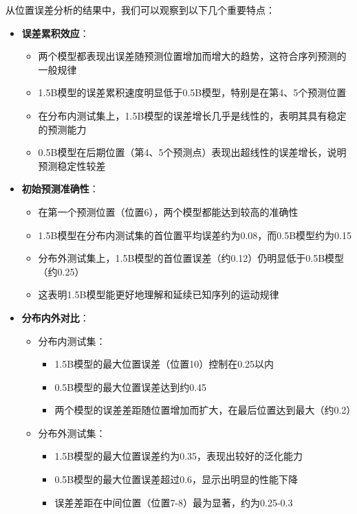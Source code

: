 \documentclass[a4paper, 12pt]{article}
\begin{document}
从位置误差分析的结果中，我们可以观察到以下几个重要特点：

\begin{itemize}
    \item \textbf{误差累积效应}：
        \begin{itemize}
            \item 两个模型都表现出误差随预测位置增加而增大的趋势，这符合序列预测的一般规律
            \item 1.5B模型的误差累积速度明显低于0.5B模型，特别是在第4、5个预测位置
            \item 在分布内测试集上，1.5B模型的误差增长几乎是线性的，表明其具有稳定的预测能力
            \item 0.5B模型在后期位置（第4、5个预测点）表现出超线性的误差增长，说明预测稳定性较差
        \end{itemize}
    
    \item \textbf{初始预测准确性}：
        \begin{itemize}
            \item 在第一个预测位置（位置6），两个模型都能达到较高的准确性
            \item 1.5B模型在分布内测试集的首位置平均误差约为0.08，而0.5B模型约为0.15
            \item 分布外测试集上，1.5B模型的首位置误差（约0.12）仍明显低于0.5B模型（约0.25）
            \item 这表明1.5B模型能更好地理解和延续已知序列的运动规律
        \end{itemize}
    
    \item \textbf{分布内外对比}：
        \begin{itemize}
            \item 分布内测试集：
                \begin{itemize}
                    \item 1.5B模型的最大位置误差（位置10）控制在0.25以内
                    \item 0.5B模型的最大位置误差达到约0.45
                    \item 两个模型的误差差距随位置增加而扩大，在最后位置达到最大（约0.2）
                \end{itemize}
            \item 分布外测试集：
                \begin{itemize}
                    \item 1.5B模型的最大位置误差约为0.35，表现出较好的泛化能力
                    \item 0.5B模型的最大位置误差超过0.6，显示出明显的性能下降
                    \item 误差差距在中间位置（位置7-8）最为显著，约为0.25-0.3
                \end{itemize}
        \end{itemize}
\end{itemize}
\end{document}
